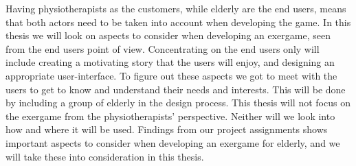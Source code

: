 Having physiotherapists as the customers, while elderly are the end users, means that both actors need to be taken into account when developing the game. In this thesis we will look on aspects to consider when developing an exergame, seen from the end users point of view. Concentrating on the end users only will include creating a motivating story that the users will enjoy, and designing an appropriate user-interface. To figure out these aspects we got to meet with the users to get to know and understand their needs and interests. This will be done by including a group of elderly in the design process. This thesis will not focus on the exergame from the physiotherapists' perspective. Neither will we look into how and where it will be used. Findings from our project assignments shows important aspects to consider when developing an exergame for elderly, and we will take these into consideration in this thesis.  

